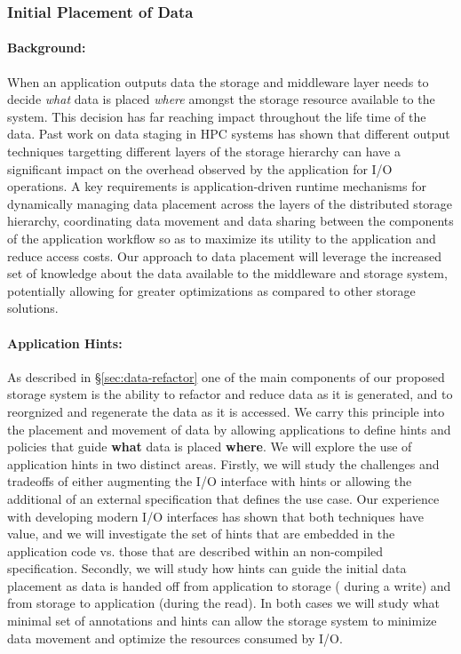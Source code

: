 \subsubsection{Initial Placement of Data}
\label{sec:init-plac-data}

\paragraph{Background:}
When an application outputs data the storage and middleware layer needs to
decide \textit{what} data is placed \textit{where} amongst the storage
resource available to the system. This decision has far reaching impact
throughout the life time of the data. Past work on data
staging\cite{tongipdps15,qiansc15}\cite{docan2012dataspaces}\cite{abbasi2010datastager}
in HPC systems has shown that different output techniques targetting
different layers of the storage hierarchy can have a significant impact on
the overhead observed by the application for I/O operations. A key
requirements is application-driven runtime mechanisms for dynamically
managing data placement across the layers of the distributed storage
hierarchy, coordinating data movement and data sharing between the
components of the application workflow so as to maximize its utility to the
application and reduce access costs. Our approach to data placement will
leverage the increased set of knowledge about the data available to the
middleware and storage system, potentially allowing for greater
optimizations as compared to other storage solutions.

\paragraph{Application Hints:}
As described in \S\ref{sec:data-refactor} one of the main components of our
proposed storage system is the ability to refactor and reduce data as it is
generated, and to reorgnized and regenerate the data as it is accessed. We
carry this principle into the placement and movement of data by allowing
applications to define hints and policies that guide \textbf{what} data is
placed \textbf{where}. We will explore the use of application hints in two
distinct areas. Firstly, we will study the challenges and tradeoffs of either
augmenting the I/O interface with hints or allowing the additional of an
external specification that defines the use case. Our experience with
developing modern I/O interfaces has shown that both techniques have value,
and we will investigate the set of hints that are embedded in the
application code vs. those that are described within an non-compiled
specification. Secondly, we will study how hints can guide the initial data
placement as data is handed off from application to storage ( during a
write) and from storage to application (during the read). In both cases we
will study what minimal set of annotations and hints can allow the storage
system to minimize data movement and optimize the resources consumed by I/O. 

